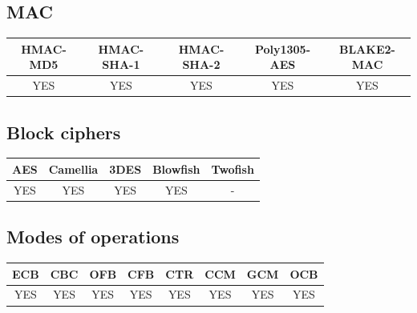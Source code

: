 \subsection{MAC}
\begin{table}[!ht]
	\begin{tabular}{|| c | c | c | c | c ||}
		\textbf{HMAC-MD5} & \textbf{HMAC-SHA-1} & \textbf{HMAC-SHA-2} & \textbf{Poly1305-AES} & \textbf{BLAKE2-MAC} \\
		\hline \hline
		YES & YES & YES & YES & YES \\
	\end{tabular}
\end{table}

\subsection{Block ciphers}
\begin{table}[!h]
	\begin{tabular}{|| c | c | c | c | c ||}
		\textbf{AES} & \textbf{Camellia} & \textbf{3DES} & \textbf{Blowfish} & \textbf{Twofish} \\
		\hline \hline
		YES & YES & YES & YES & - \\
	\end{tabular}
\end{table}

\subsection{Modes of operations}
\begin{table}[!h]
	\begin{tabular}{|| c | c | c | c | c | c | c | c ||}
		\textbf{ECB} & \textbf{CBC} & \textbf{OFB} & \textbf{CFB} & \textbf{CTR} & \textbf{CCM} & \textbf{GCM} & \textbf{OCB} \\
		\hline \hline
		YES & YES & YES & YES & YES  & YES & YES & YES\\
	\end{tabular}
\end{table}

